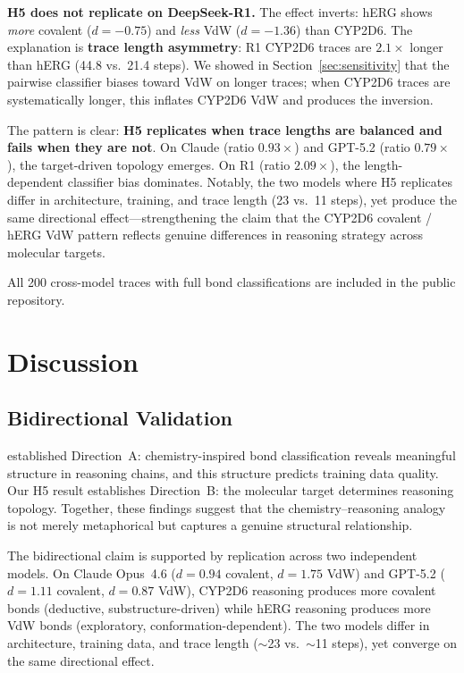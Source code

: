 \documentclass[11pt]{article}
\begin{document}
\textbf{H5 does not replicate on DeepSeek-R1.} The effect inverts: hERG shows \emph{more} covalent ($d = -0.75$) and \emph{less} VdW ($d = -1.36$) than CYP2D6. The explanation is \textbf{trace length asymmetry}: R1 CYP2D6 traces are $2.1\times$ longer than hERG (44.8 vs.\ 21.4 steps). We showed in Section~\ref{sec:sensitivity} that the pairwise classifier biases toward VdW on longer traces; when CYP2D6 traces are systematically longer, this inflates CYP2D6 VdW and produces the inversion.

The pattern is clear: \textbf{H5 replicates when trace lengths are balanced and fails when they are not}. On Claude (ratio $0.93\times$) and GPT-5.2 (ratio $0.79\times$), the target-driven topology emerges. On R1 (ratio $2.09\times$), the length-dependent classifier bias dominates. Notably, the two models where H5 replicates differ in architecture, training, and trace length (23 vs.\ 11 steps), yet produce the same directional effect---strengthening the claim that the CYP2D6 covalent / hERG VdW pattern reflects genuine differences in reasoning strategy across molecular targets.

All 200 cross-model traces with full bond classifications are included in the public repository.

\section{Discussion}
\label{sec:discussion}

\subsection{Bidirectional Validation}

\citet{chen2026molecular} established Direction~A: chemistry-inspired bond classification reveals meaningful structure in reasoning chains, and this structure predicts training data quality. Our H5 result establishes Direction~B: the molecular target determines reasoning topology. Together, these findings suggest that the chemistry--reasoning analogy is not merely metaphorical but captures a genuine structural relationship.

The bidirectional claim is supported by replication across two independent models. On Claude Opus~4.6 ($d = 0.94$ covalent, $d = 1.75$ VdW) and GPT-5.2 ($d = 1.11$ covalent, $d = 0.87$ VdW), CYP2D6 reasoning produces more covalent bonds (deductive, substructure-driven) while hERG reasoning produces more VdW bonds (exploratory, conformation-dependent). The two models differ in architecture, training data, and trace length ($\sim$23 vs.\ $\sim$11 steps), yet converge on the same directional effect.
\end{document}

